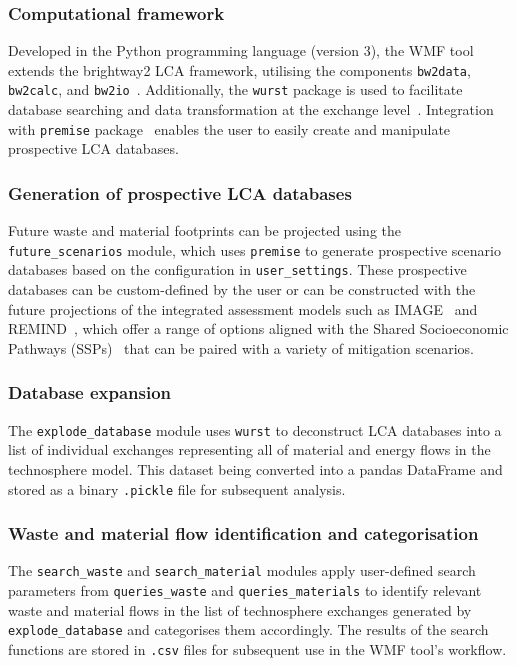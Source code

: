 \subsubsection{Computational framework}
Developed in the Python programming language (version 3), the WMF tool extends the brightway2 LCA framework, utilising the components \texttt{bw2data}, \texttt{bw2calc}, and \texttt{bw2io}~\citep{mutel2017brightway}. Additionally, the \texttt{wurst} package is used to facilitate database searching and data transformation at the exchange level~\citep{mutel2017wurst}. Integration with \texttt{premise} package~\citep{sacchi2022premise} enables the user to easily create and manipulate prospective LCA databases. 


\subsubsection{Generation of prospective LCA databases}
Future waste and material footprints can be projected using the \texttt{future\_scenarios} module, which uses \texttt{premise} to generate prospective scenario databases based on the configuration in \texttt{user\_settings}. These prospective databases can be custom-defined by the user or can be constructed with the future projections of the integrated assessment models such as IMAGE~\citep{stehfest2014image} and REMIND~\citep{remind2020model}, which offer a range of options aligned with the Shared Socioeconomic Pathways (SSPs)~\citep{ssp2020ghg}  that can be paired with a variety of mitigation scenarios.

\subsubsection{Database expansion}
The \texttt{explode\_database} module uses \texttt{wurst} to deconstruct LCA databases into a list of individual exchanges representing all of material and energy flows in the technosphere model. This dataset being converted into a pandas DataFrame and stored as a binary \texttt{.pickle} file for subsequent analysis.

\subsubsection{Waste and material flow identification and categorisation}

The \texttt{search\_waste} and \texttt{search\_material} modules apply user-defined search parameters from \texttt{queries\_waste} and \texttt{queries\_materials} to identify relevant waste and material flows in the list of technosphere exchanges generated by \texttt{explode\_database} and categorises them accordingly. The results of the search functions are stored in \texttt{.csv} files for subsequent use in the WMF tool's workflow.

